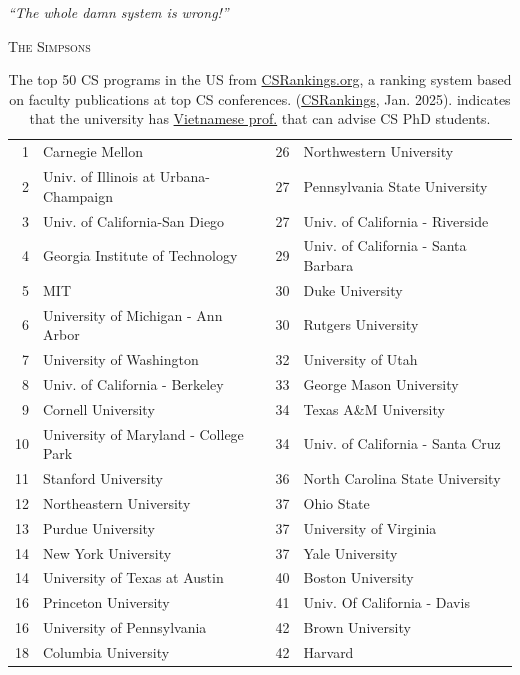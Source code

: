 \documentclass[oneside,11pt,dvipsnames]{book}
\newcommand{\myepigraphsimpsons}[1]{
\epigraph{\vspace{-0.2in} \emph{#1}}{\textsc{The Simpsons}}
}
\newcommand{\red}[1]{{\color{red}{#1}}}
\begin{document}
\myepigraphsimpsons{``The whole damn system is wrong!''}

\begin{table}
  \centering
  \small
  \caption{The top 50 CS programs in the US from \href{https://www.csrankings.org}{CSRankings.org}, a ranking system  based on faculty publications at top CS conferences. (\href{https://csrankings.org}{CSRankings}, Jan. 2025). \red{$^*$} indicates that the university has \href{https://github.com/dynaroars/dynaroars.github.io/wiki/Viet-CS-Profs-US}{Vietnamese prof.} that can advise CS PhD students.}\label{tab:ranking}
  \begin{tabular}{rl|rl}
    \toprule
    1 & Carnegie Mellon & 26 & Northwestern University\\
    2 & Univ. of Illinois at Urbana-Champaign\red{$^*$}  & 27 & Pennsylvania State University  \\
    3 & Univ. of California-San Diego & 27 & Univ. of California - Riverside \\
    4 & Georgia Institute of Technology & 29 & Univ. of California - Santa Barbara \\
    5 & MIT                            & 30 &   Duke University \\
    6 & University of Michigan - Ann Arbor\red{$^*$}  & 30 & Rutgers University\red{$^*$} \\
    7 & University of Washington    & 32& University of Utah\\
    8 & Univ. of California - Berkeley    &33 & George Mason University\red{$^*$}\\
    9 & Cornell University   &34&   Texas A\&M University\red{$^*$}  \\
    10 & University of Maryland - College Park & 34 &  Univ. of California - Santa Cruz \\
    11 & Stanford University  &  36& North Carolina State University \\
    12 & Northeastern University\red{$^*$} &37& Ohio State \\
    13 & Purdue University &37& University of Virginia  \\
    14 & New York University  &37 & Yale University \\
    14 & University of Texas at Austin &40& Boston University  \\
    16 & Princeton University\red{$^*$}&41 & Univ. Of California - Davis \\
    16 & University of Pennsylvania  &42 & Brown University \\
    18 & Columbia University\red{$^*$}  & 42& Harvard \\

\end{tabular}
\end{table}
\end{document}
